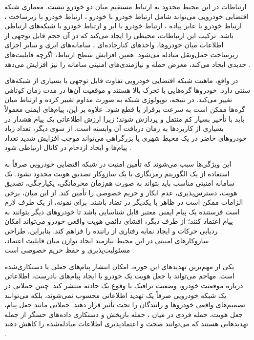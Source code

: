 \documentclass[12pt,a4paper]{article}
\begin{document}
ارتباطات در این محیط محدود به ارتباط مستقیم میان دو خودرو نیست. معماری شبکه اقتضایی خودرویی می‌تواند شامل ارتباط خودرو با خودرو ، ارتباط خودرو با زیرساخت ، ارتباط خودرو با عابر پیاده ، ارتباط خودرو با ابر  و ارتباط خودرو با شبکه‌های ارتباطی  باشد. ترکیب این ارتباطات، محیطی را ایجاد می‌کند که در آن حجم قابل توجهی از اطلاعات میان خودروها، واحدهای کنارجاده‌ای ، سامانه‌های ابری و سایر اجزای زیرساخت حمل‌ونقل مبادله می‌شود. همین افزایش سطح ارتباط، اگرچه قابلیت‌های جدیدی ایجاد می‌کند، معرض حمله و نیازمندی‌های امنیتی سامانه را نیز افزایش می‌دهد \cite{hozouriOverviewVANETVehicular2023}.

در واقع، ماهیت شبکه اقتضایی خودرویی تفاوت قابل توجهی با بسیاری از شبکه‌های سنتی دارد. خودروها گره‌هایی با تحرک بالا هستند و موقعیت آن‌ها در مدت زمان کوتاهی تغییر می‌کند. در نتیجه، توپولوژی شبکه به صورت مداوم تغییر کرده و ارتباط میان گره‌ها ممکن است به سرعت برقرار یا قطع شود. علاوه بر این، پیام‌های ایمنی معمولاً باید با تأخیر بسیار کم منتقل و پردازش شوند؛ زیرا ارزش اطلاعاتی یک پیام هشدار در بسیاری از کاربردها به زمان دریافت آن وابسته است. از سوی دیگر، تعداد زیاد خودروهای حاضر در یک محیط شهری یا بزرگراهی می‌تواند موجب افزایش شدید تعداد پیام‌ها و ایجاد ازدحام در کانال ارتباطی شود \cite{hozouriOverviewVANETVehicular2023,xuInternetVehiclesBig2018}.

این ویژگی‌ها سبب می‌شوند که تأمین امنیت در شبکه اقتضایی خودرویی صرفاً به استفاده از یک الگوریتم رمزنگاری یا یک سازوکار تصدیق هویت محدود نشود. یک سامانه امنیتی مناسب باید بتواند به صورت هم‌زمان محرمانگی، یکپارچگی، تصدیق هویت، دسترس‌پذیری، عدم انکار و حریم خصوصی را تأمین کند. از این میان، برخی الزامات ممکن است در ظاهر با یکدیگر در تضاد باشند. برای نمونه، از یک طرف لازم است فرستنده یک پیام ایمنی معتبر قابل شناسایی باشد تا خودروهای دیگر بتوانند به پیام اعتماد کنند؛ از طرف دیگر، افشای دائمی هویت واقعی خودرو می‌تواند امکان ردیابی حرکات و ایجاد نمایه رفتاری از راننده را فراهم کند. بنابراین، طراحی سازوکارهای امنیتی در این محیط نیازمند ایجاد توازن میان قابلیت اعتماد، مسئولیت‌پذیری و حفظ حریم خصوصی است \cite{farsimadanReviewSecurityChallenges2025,VanetSecurityPrivacy}.

یکی از مهم‌ترین تهدیدهای این حوزه، امکان انتشار پیام‌های جعلی یا دستکاری‌شده است. مهاجم می‌تواند با جعل هویت یک خودرو یا ایجاد پیام‌های نادرست، اطلاعاتی درباره موقعیت خودرو، وضعیت ترافیک یا وقوع یک حادثه منتشر کند. چنین حملاتی در یک شبکه خودرویی صرفاً یک تهدید اطلاعاتی محسوب نمی‌شوند، بلکه می‌توانند تصمیم‌های واقعی خودروها و رانندگان را تحت تأثیر قرار دهند. حملاتی مانند جعل پیام، جعل هویت، حمله فردی در میان ، حمله بازپخش  و دستکاری داده‌های حسگر از جمله تهدیدهایی هستند که می‌توانند صحت و اعتمادپذیری اطلاعات مبادله‌شده را کاهش دهند \cite{farsimadanReviewSecurityChallenges2025,VanetSecurityPrivacy}.
\end{document}
